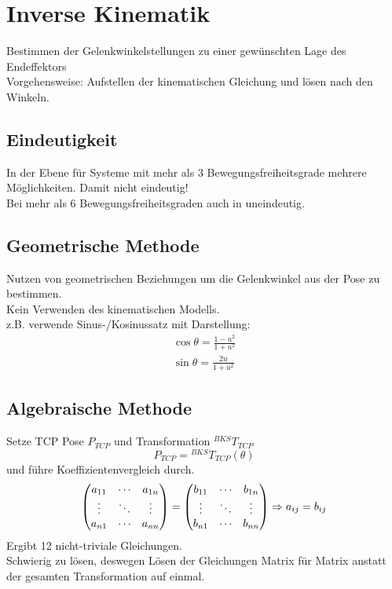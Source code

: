

\section{Inverse Kinematik}
Bestimmen der Gelenkwinkelstellungen zu einer gewünschten Lage des Endeffektors\\
Vorgehensweise: Aufstellen der kinematischen Gleichung und lösen nach den Winkeln.

\subsection{Eindeutigkeit}
In der Ebene für Systeme mit mehr als 3 Bewegungsfreiheitsgrade mehrere Möglichkeiten. Damit nicht eindeutig!\\
Bei mehr als 6 Bewegungsfreiheitsgraden auch in \SE uneindeutig.

\subsection{Geometrische Methode}
Nutzen von geometrischen Beziehungen um die Gelenkwinkel aus der Pose zu bestimmen.\\
Kein Verwenden des kinematischen Modells.\\
z.B. verwende Sinus-/Kosinussatz mit Darstellung: 
\begin{align*}
  \cos \theta = \frac{1 - u^2}{1 + u^2}\\
  \sin \theta = \frac{2u}{1 + u^2}
\end{align*}

\subsection{Algebraische Methode}
Setze TCP Pose \(P_{TCP}\) und Transformation \({}^{BKS}T_{TCP}\)
\[P_{TCP} = {}^{BKS}T_{TCP}(\theta)\]
und führe Koeffizientenvergleich durch.
\[\begin{pmatrix}a_{11} & \cdots & a_{1n}\\ \vdots & \ddots & \vdots \\ a_{n1} & \cdots & a_{nn} \end{pmatrix} =
  \begin{pmatrix}b_{11} & \cdots & b_{1n}\\ \vdots & \ddots & \vdots \\ b_{n1} & \cdots & b_{nn} \end{pmatrix} \Rightarrow a_{ij} = b_{ij}\]
Ergibt 12 nicht-triviale Gleichungen.\\
Schwierig zu lösen, deswegen Lösen der Gleichungen Matrix für Matrix anstatt der gesamten Transformation auf einmal.

